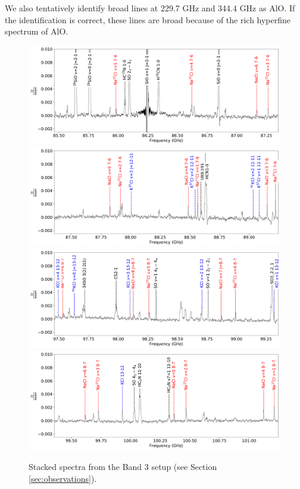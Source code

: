 \documentclass[twocolumn]{aastex62}
\begin{document}
We also tentatively identify broad lines at 229.7 GHz and 344.4 GHz as AlO.  If
the identification is correct, these lines are broad because of the rich
hyperfine spectrum of AlO.

%

\begin{figure}[!htp]
\includegraphics[scale=1,width=5.5in]{figures/color_labels_OrionSourceI_B3_spw0_robust0.5.pdf}
\includegraphics[scale=1,width=5.5in]{figures/color_labels_OrionSourceI_B3_spw1_robust0.5.pdf}
\includegraphics[scale=1,width=5.5in]{figures/color_labels_OrionSourceI_B3_spw2_robust0.5.pdf}
\includegraphics[scale=1,width=5.5in]{figures/color_labels_OrionSourceI_B3_spw3_robust0.5.pdf}
\caption{Stacked spectra from the Band 3 setup (see Section \ref{sec:observations}).}
\label{fig:spectrab3}
\end{figure}
\end{document}
